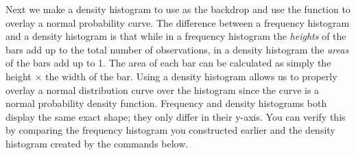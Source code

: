 \documentclass[11pt]{article}
\begin{document}
Next we make a density histogram to use as the backdrop and use the \texttt{} function to overlay a normal probability curve. The difference between a frequency histogram and a density histogram is that while in a frequency histogram the \textit{heights} of the bars add up to the total number of observations, in a density histogram the \textit{areas} of the bars add up to 1. The area of each bar can be calculated as simply the height $\times$ the width of the bar. Using a density histogram allows us to properly overlay a normal distribution curve over the histogram since the curve is a normal probability density function. Frequency and density histograms both display the same exact shape; they only differ in their y-axis. You can verify this by comparing the frequency histogram you constructed earlier and the density histogram created by the commands below.

\ttfamily\noindent
\hlstd{}\hspace*{\fill}\\
\hlstd{}\hlkeyword{(}\hlkeyword{,}{\ }\hlargument{=}{\ }\hlkeyword{)}\hspace*{\fill}\\
\hlstd{}\hlassignement{\usebox{\hlnormalsizeboxlessthan}-}{\ }\hlkeyword{:}\hspace*{\fill}\\
\hlstd{}\hlassignement{\usebox{\hlnormalsizeboxlessthan}-}{\ }\hlkeyword{(}\hlargument{=}{\ }\hlkeyword{,}{\ }\hlargument{=}{\ }\hlkeyword{,}{\ }\hlargument{=}{\ }\hlkeyword{)}\hspace*{\fill}\\
\hlstd{}\hlkeyword{(}\hlargument{=}{\ }\hlkeyword{,}{\ }\hlargument{=}{\ }\hlkeyword{,}{\ }\hlargument{=}{\ }\hlkeyword{)}\hspace*{\fill}\\
\normalfont
\end{document}
